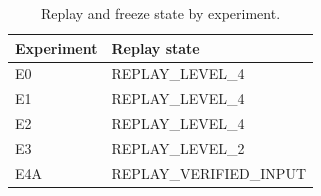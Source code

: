 \begin{table}[t]
\centering
\small
\begin{tabular}{ll}
\toprule
Experiment & Replay state \\
\midrule
E0 & REPLAY\_LEVEL\_4 \\
E1 & REPLAY\_LEVEL\_4 \\
E2 & REPLAY\_LEVEL\_4 \\
E3 & REPLAY\_LEVEL\_2 \\
E4A & REPLAY\_VERIFIED\_INPUT \\
\bottomrule
\end{tabular}
\caption{Replay and freeze state by experiment.}
\label{tab:replay}
\end{table}
